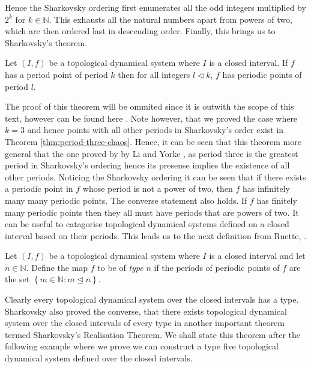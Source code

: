 Hence the Sharkovsky ordering first enumerates all the odd integers multiplied by $2^k$ for $k \in \mathbb{N}$. This exhausts all the natural numbers apart from powers of two, which are then ordered last in descending order. Finally, this brings us to Sharkovsky's theorem.

\begin{thm} \label{thm:sharkovskys-forcing-theorem}
    Let $(I, f)$ be a topological dynamical system where $I$ is a closed interval. If $f$ has a period point of period $k$ then for all integers $l \lhd k$, $f$ has periodic points of period $l$.
\end{thm}

The proof of this theorem will be ommited since it is outwith the scope of this text, however can be found here \cite{sharkovsky}. Note however, that we proved the case where $k = 3$ and hence points with all other periods in Sharkovsky's order exist in Theorem \ref{thm:period-three-chaos}. Hence, it can be seen that this theorem more general that the one proved by by Li and Yorke \cite{li-yorke}, as period three is the greatest period in Sharkovsky's ordering hence its presense implies the existence of all other periods. Noticing the Sharkovsky ordering it can be seen that if there exists a periodic point in $f$ whose period is not a power of two, then $f$ has infinitely many many periodic points. The converse statement also holds. If $f$ has finitely many periodic points then they all must have periods that are powers of two. It can be useful to catagorise topological dynamical systems defined on a closed interval based on their periods. This leads us to the next definition from Ruette, \cite[\S 3.3]{ruette}.

\begin{defn}[Type] \label{def:type}
    Let $(I, f)$ be a topological dynamical system where $I$ is a closed interval and let $n \in \mathbb{N}$. Define the map $f$ to be of \emph{type} $n$ if the periods of periodic points of $f$ are the set $\left\lbrace m \in \mathbb{N} : m \unlhd n \right\rbrace$.
\end{defn}

Clearly every topological dynamical system over the closed intervals has a type. Sharkovsky also proved the converse, that there exists topological dynamical system over the closed intervals of every type in another important theorem termed Sharkovsky's Realisation Theorem. We shall state this theorem after the following example where we prove we can construct a type five topological dynamical system defined over the closed intervals.


